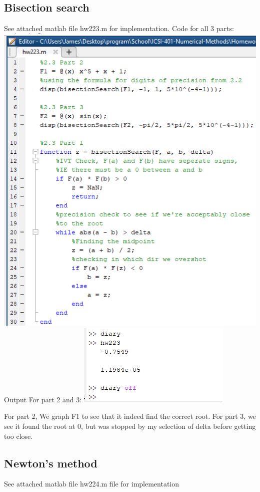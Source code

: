 \documentclass{article}
\begin{document}
\subsection{Bisection search}
See attached matlab file hw223.m for implementation.
\newline
Code for all 3 parts:
\newline
\includegraphics[scale=0.7]{Homework2/2.3code.png}
\newpage
Output For part 2 and 3:
\newline
\includegraphics{Homework2/2.3diary.png}
\newline

For part 2, We graph F1 to see that it indeed find the correct root. 
For part 3, we see it found the root at 0, but was stopped by my selection of delta before getting too close.

\subsection{Newton’s method}
See attached matlab file hw224.m file for implementation 
\end{document}
